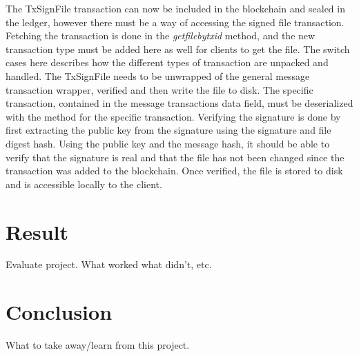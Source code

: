 \documentclass[11pt]{article}
\begin{document}
The TxSignFile transaction can now be included in the blockchain and sealed in the ledger, however there must be a way of accessing the signed file transaction. Fetching the transaction is done in the \textit{getfilebytxid} method, and the new transaction type must be added here as well for clients to get the file. The switch cases here describes how the different types of transaction are unpacked and handled. The TxSignFile needs to be unwrapped of the general message transaction wrapper, verified and then write the file to disk. The specific transaction, contained in the message transactions data field, must be deserialized with the method for the specific transaction. Verifying the signature is done by first extracting the public key from the signature using the signature and file digest hash. Using the public key and the message hash, it should be able to verify that the signature is real and that the file has not been changed since the transaction was added to the blockchain. Once verified, the file is stored to disk and is accessible locally to the client. 

\section{Result}
Evaluate project. What worked what didn't, etc.

\section{Conclusion}
What to take away/learn from this project.

\newpage
 

\listoffigures
\end{document}
